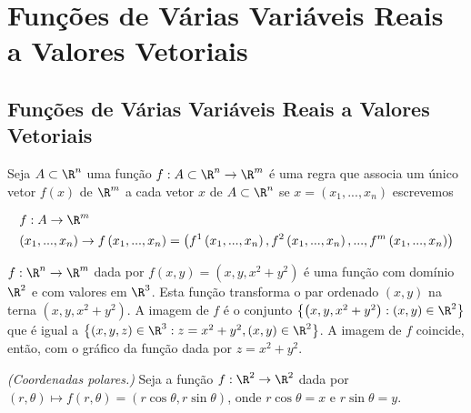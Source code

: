 \documentclass[11pt, oneside, a4paper]{gsm-l}
\begin{document}
\chapter{Funções de Várias Variáveis Reais a Valores Vetoriais} \label{chap05}

\section{Funções de Várias Variáveis Reais a Valores Vetoriais} \label{sec23}

\begin{defi}
Seja $A \subset \R^n$ uma função $f:A \subset \R^n \to \R^m$ é uma regra que associa um \'unico vetor $f(x)$ de $\R^m$ a cada vetor $x$ de $A \subset \R^n$ se $x = \left( {x_1 ,...,x_n } \right)$ escrevemos

\[
\begin{gathered}
  f:A \to \R^m  \hfill \\
  \left( {x_1 ,...,x_n } \right) \to f\left( {x_1 ,...,x_n } \right) = \left( {f^1 \left( {x_1 ,...,x_n } \right),f^2 \left( {x_1 ,...,x_n } \right),...,f^m \left( {x_1 ,...,x_n } \right)} \right) \hfill \\
\end{gathered}
\]

\end{defi}

\begin{exem}
$f:\R^n  \to \R^m$ dada por $f\left( {x,y} \right) = \left( {x,y,x^2  + y^2 } \right)$ é uma função com domínio $\R^2$ e com valores em $\R^3$. Esta função transforma o par ordenado $(x,y)$ na terna $(x,y,x^2+y^2)$. A imagem de $f$ é o conjunto $\left\{ {\left( {x,y,x^2  + y^2 } \right):\left( {x,y} \right) \in \R^2 } \right\}$ que é igual a $\left\{ {\left( {x,y,z} \right) \in \R^3 :z = x^2  + y^2 ,\left( {x,y} \right) \in \R^2 } \right\}$. A imagem de $f$ coincide, então, com o gráfico da função dada por $z=x^2+y^2$.

\end{exem}

\begin{exem}
\textit{(Coordenadas polares.)} Seja a função $f:\R^2  \to \R^2$ dada por $\left( {r,\theta } \right) \mapsto f\left( {r,\theta } \right) = \left( {r\cos \theta ,r\sin \theta } \right)$, onde $r\cos \theta = x$ e $r\sin \theta = y$.

\end{exem}
\end{document}
